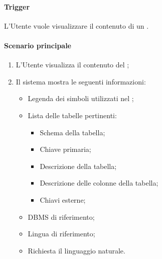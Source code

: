 \paragraph*{Trigger}
L'Utente vuole visualizzare il contenuto di un .

\paragraph*{Scenario principale}
\begin{enumerate}
  \item L'Utente visualizza il contenuto del ;
  \item Il sistema mostra le seguenti informazioni:
  \begin{itemize}
    \item Legenda dei simboli utilizzati nel ;
    \item Lista delle tabelle pertinenti:
    \begin{itemize}
      \item Schema della tabella;
      \item Chiave primaria;
      \item Descrizione della tabella;
      \item Descrizione delle colonne della tabella;
      \item Chiavi esterne;
    \end{itemize}
    \item DBMS di riferimento;
    \item Lingua di riferimento;
    \item Richiesta il linguaggio naturale.
  \end{itemize}
\end{enumerate}
